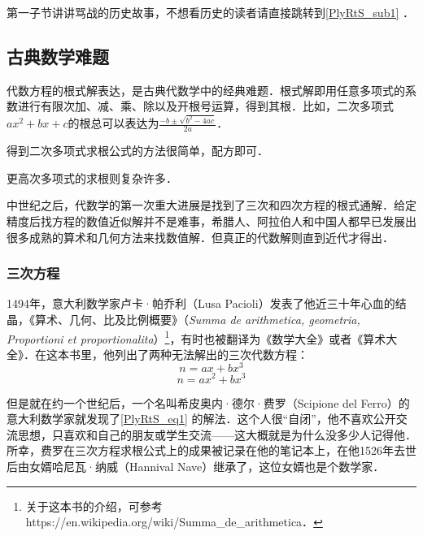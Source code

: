


第一子节讲讲骂战的历史故事，不想看历史的读者请直接跳转到\autoref{PlyRtS_sub1} ．

\subsection{古典数学难题}

代数方程的根式解表达，是古典代数学中的经典难题．根式解即用任意多项式的系数进行有限次加、减、乘、除以及开根号运算，得到其根．比如，二次多项式$ax^2+bx+c$的根总可以表达为$\frac{-b\pm\sqrt{b^2-4ac}}{2a}$．

得到二次多项式求根公式的方法很简单，配方即可．

更高次多项式的求根则复杂许多．

中世纪之后，代数学的第一次重大进展是找到了三次和四次方程的根式通解．给定精度后找方程的数值近似解并不是难事，希腊人、阿拉伯人和中国人都早已发展出很多成熟的算术和几何方法来找数值解．但真正的代数解则直到近代才得出．

\subsubsection{三次方程}

1494年，意大利数学家卢卡·帕乔利（Lusa Pacioli）发表了他近三十年心血的结晶，《算术、几何、比及比例概要》（\textsl{Summa de arithmetica, geometria, Proportioni et proportionalita}）\footnote{关于这本书的介绍，可参考https://en.wikipedia.org/wiki/Summa_de_arithmetica．}，有时也被翻译为《数学大全》或者《算术大全》．在这本书里，他列出了两种无法解出的三次代数方程：
\begin{equation}\label{PlyRtS_eq1}
n=ax+bx^3
\end{equation}
\begin{equation}\label{PlyRtS_eq2}
n=ax^2+bx^3
\end{equation}

但是就在约一个世纪后，一个名叫希皮奥内·德尔·费罗（Scipione del Ferro）的意大利数学家就发现了\autoref{PlyRtS_eq1} 的解法．这个人很“自闭”，他不喜欢公开交流思想，只喜欢和自己的朋友或学生交流——这大概就是为什么没多少人记得他．所幸，费罗在三次方程求根公式上的成果被记录在他的笔记本上，在他1526年去世后由女婿哈尼瓦·纳威（Hannival Nave）继承了，这位女婿也是个数学家．

